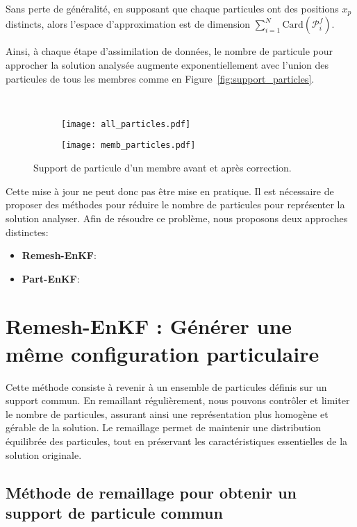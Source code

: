 Sans perte de généralité, en supposant que chaque particules ont des positions $x_p$ distincts, alors l'espace d'approximation est de dimension $\sum_{i=1}^{N} \text{Card}(\mathcal{P}^f_i)$.

Ainsi, à chaque étape d'assimilation de données, le nombre de particule pour approcher la solution analysée augmente exponentiellement avec l'union des particules de tous les membres comme en Figure~\ref{fig:support_particles}.

\begin{figure}~\label{fig:support_particles}
    \centering
    \begin{subfigure}{0.5\textwidth}
        \texttt{[image: all\_particles.pdf]}
    \end{subfigure}
    \begin{subfigure}{0.5\textwidth}
        \texttt{[image: memb\_particles.pdf]}
    \end{subfigure}
    \caption{Support de particule d'un membre avant et après correction.}
\end{figure}

Cette mise à jour ne peut donc pas être mise en pratique. Il est nécessaire de proposer des méthodes pour réduire le nombre de particules pour représenter la solution analyser. Afin de résoudre ce problème, nous proposons deux approches distinctes:

\begin{itemize}
    \item \textbf{Remesh-EnKF}: \\
    \item \textbf{Part-EnKF}: \\
\end{itemize}

\section{Remesh-EnKF : Générer une même configuration particulaire}

Cette méthode consiste à revenir à un ensemble de particules définis sur un support commun. En remaillant régulièrement, nous pouvons contrôler et limiter le nombre de particules, assurant ainsi une représentation plus homogène et gérable de la solution. Le remaillage permet de maintenir une distribution équilibrée des particules, tout en préservant les caractéristiques essentielles de la solution originale.

\subsection{Méthode de remaillage pour obtenir un support de particule commun}~\label{sec:remesh}

